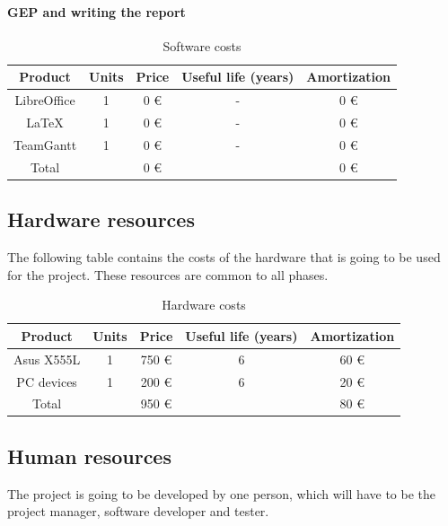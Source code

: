 \paragraph{GEP and writing the report}

\begin{table}[h!]
	\centering
	\def\arraystretch{1.2}
	\begin{tabular}{|c c c c c|} 
		\hline
		Product & Units & Price & Useful life (years) & Amortization \\
		\hline\hline
		LibreOffice & 1 & 0 \euro & - & 0 \euro \\ 
		\hline
		LaTeX & 1 & 0 \euro & - & 0 \euro \\
		\hline
		TeamGantt & 1 & 0 \euro & - & 0 \euro \\
		\hline\hline
		Total &   & 0 \euro &  & 0 \euro \\
		\hline
	\end{tabular}
	\caption{Software costs}
\end{table}

\subsection{Hardware resources}

The following table contains the costs of the hardware that is going to be used for the project. These resources are common to all phases.

\begin{table}[h!]
	\centering
	\def\arraystretch{1.2}
	\begin{tabular}{|c c c c c|} 
		\hline
		Product & Units & Price & Useful life (years) & Amortization \\
		\hline\hline
		Asus X555L & 1 & 750 \euro & 6 & 60 \euro \\ 
		\hline
		PC devices & 1 & 200 \euro & 6 & 20 \euro \\
		\hline\hline
		Total &   & 950 \euro &  & 80 \euro \\
		\hline
	\end{tabular}
	\caption{Hardware costs}
\end{table}

\subsection{Human resources}

The project is going to be developed by one person, which will have to be the project manager, software developer and tester. 

